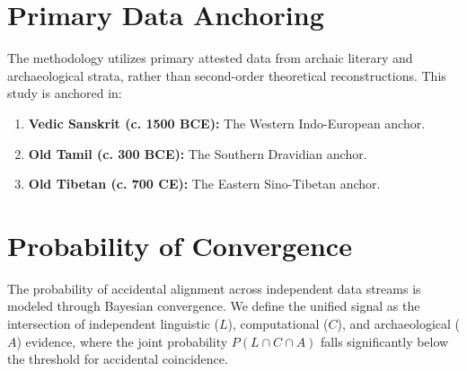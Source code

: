 \section{Primary Data Anchoring}
The methodology utilizes primary attested data from archaic literary and archaeological strata, rather than second-order theoretical reconstructions. This study is anchored in:
\begin{enumerate}
    \item \textbf{Vedic Sanskrit (c. 1500 BCE):} The Western Indo-European anchor.
    \item \textbf{Old Tamil (c. 300 BCE):} The Southern Dravidian anchor.
    \item \textbf{Old Tibetan (c. 700 CE):} The Eastern Sino-Tibetan anchor.
\end{enumerate}

\section{Probability of Convergence}
The probability of accidental alignment across independent data streams is modeled through Bayesian convergence. We define the unified signal as the intersection of independent linguistic ($L$), computational ($C$), and archaeological ($A$) evidence, where the joint probability $P(L \cap C \cap A)$ falls significantly below the threshold for accidental coincidence.

